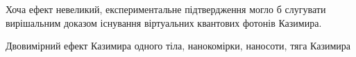 \documentclass[twoside, 10pt]{article}
\begin{document}
    Хоча ефект невеликий, експериментальне підтвердження
могло б слугувати вирішальним доказом існування віртуальних квантових фотонів Казимира.

\vspace{5mm}

\noindent
\begin{keywordsukr}
Двовимірний ефект Казимира одного тіла, нанокомірки, наносоти, тяга Казимира
\end{keywordsukr}

    
\end{document}
